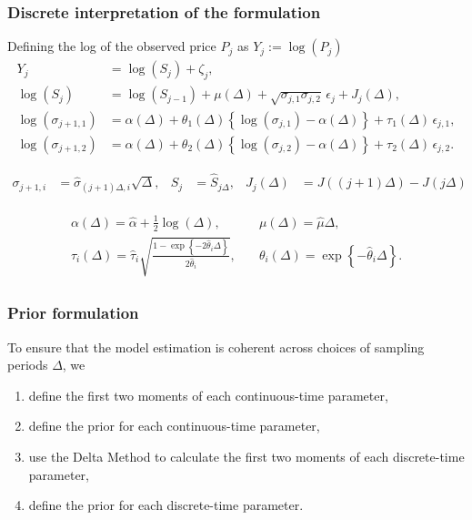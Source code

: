 \documentclass{beamer}
\newcommand{\halpha}{\hat{\alpha}}
\begin{document}
\begin{frame}
  \frametitle{Discrete interpretation of the formulation}
  Defining the log of the observed price $P_j$ as $Y_j := \log(P_j)$
  \begin{align*}
    Y_j &= \log(S_j) + \zeta_j  ,\\
    \log(S_{j}) &= \log(S_{j-1}) + \mu(\Delta) + \sqrt{\sigma_{j,1}\sigma_{j,2}} \, \epsilon_{j} + J_j(\Delta)   ,  \\
    \log(\sigma_{j+1,1}) &= \alpha(\Delta) + \theta_1(\Delta) \left\{ \log(\sigma_{j,1}) - \alpha(\Delta) \right\} + \tau_1(\Delta) \, \epsilon_{j,1}    ,  \\
    \log(\sigma_{j+1,2}) &= \alpha(\Delta) + \theta_2(\Delta) \left\{ \log(\sigma_{j,2}) - \alpha(\Delta) \right\} + \tau_2(\Delta) \, \epsilon_{j,2}.
  \end{align*}

  \begin{align*}
  \sigma_{j+1,i} &= \hat{\sigma}_{(j+1)\Delta,i}\sqrt{\Delta}, & S_j &= \hat{S}_{j\Delta}, & J_j(\Delta) &= J((j+1)\Delta) - J(j\Delta)
  \end{align*}
  
\begin{align*}
  \begin{split}
    \alpha(\Delta) = \halpha + \frac{1}{2}\log(\Delta),\quad  & 
    \mu(\Delta) = \hat{\mu} \Delta,      \\
    \tau_i(\Delta) = \hat{\tau}_i \sqrt{ \frac{1 - \exp \left\{
          -2\hat{\theta}_i \Delta \right\}}{2\hat{\theta}_i } },\quad & \theta_i(\Delta) =
    \exp\left\{
      -\hat{\theta}_i \Delta \right\}.
    \end{split}
\end{align*}
\end{frame}
\begin{frame}
  \frametitle{Prior formulation} To ensure that the model estimation
  is coherent across choices of sampling periods $\Delta$, we
  
  \begin{enumerate}
  \item define the first two moments of each continuous-time parameter,
  \item define the prior for each continuous-time parameter,
  \item use the Delta Method to calculate the first two moments of each discrete-time parameter,
  \item define the prior for each discrete-time parameter.
  \end{enumerate}
\end{frame}
\end{document}
